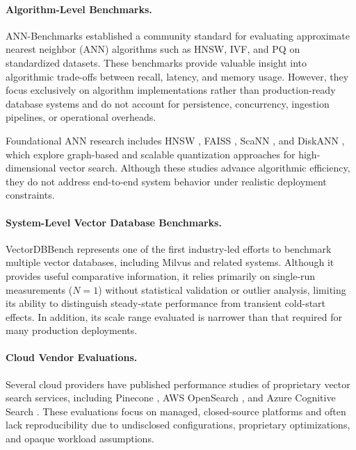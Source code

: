 \documentclass{article}
\begin{document}
\paragraph{Algorithm-Level Benchmarks.}
ANN-Benchmarks \cite{aumuller2020annbenchmarks} established a community standard
for evaluating approximate nearest neighbor (ANN) algorithms such as HNSW, IVF,
and PQ on standardized datasets. These benchmarks provide valuable insight
into algorithmic trade-offs between recall, latency, and memory usage.
However, they focus exclusively on algorithm implementations rather than
production-ready database systems and do not account for persistence,
concurrency, ingestion pipelines, or operational overheads.

Foundational ANN research includes HNSW \cite{malkov2018hnsw}, FAISS
\cite{johnson2019faiss}, ScaNN \cite{guo2020scann}, and DiskANN
\cite{jayaram2019diskann}, which explore graph-based and scalable quantization
approaches for high-dimensional vector search. Although these studies advance
algorithmic efficiency, they do not address end-to-end system behavior under
realistic deployment constraints.

\paragraph{System-Level Vector Database Benchmarks.}
VectorDBBench \cite{zilliz2024vectordbbench} represents one of the first
industry-led efforts to benchmark multiple vector databases, including Milvus
and related systems. Although it provides useful comparative information, it relies
primarily on single-run measurements ($N=1$) without statistical validation or
outlier analysis, limiting its ability to distinguish steady-state performance
from transient cold-start effects. In addition, its scale range evaluated is
narrower than that required for many production deployments.

\paragraph{Cloud Vendor Evaluations.}
Several cloud providers have published performance studies of proprietary vector
search services, including Pinecone \cite{pinecone2023benchmark}, AWS OpenSearch
\cite{awsopensearch2023}, and Azure Cognitive Search
\cite{azurevectorsearch2023}. These evaluations focus on managed, closed-source
platforms and often lack reproducibility due to undisclosed configurations,
proprietary optimizations, and opaque workload assumptions.
\end{document}
